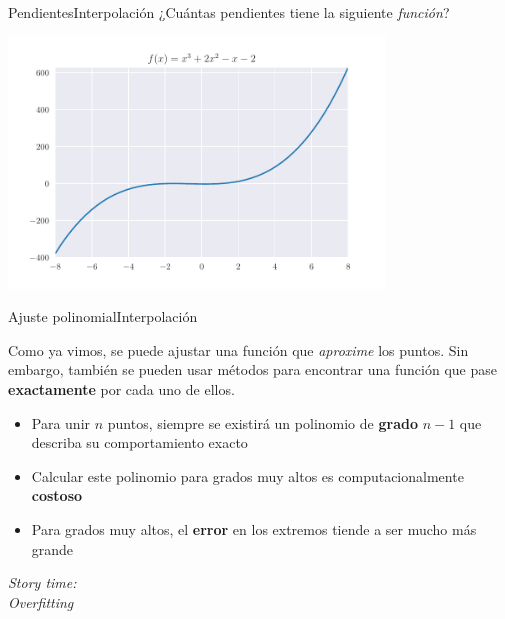 \documentclass[spanish, c, dvipsnames]{beamer}
\begin{document}
\begin{frame}{Pendientes}{Interpolación}
    ¿Cuántas pendientes tiene la siguiente \textsl{función}?

    \bigskip

    \begin{center}
        \includegraphics[width=0.75\textwidth]{cubic.pdf}
    \end{center}

\end{frame}

\begin{frame}{Ajuste polinomial}{Interpolación}
    
    Como ya vimos, se puede ajustar una función que \textsl{aproxime} los puntos.
    Sin embargo, también se pueden usar métodos para encontrar una función que pase \textbf{exactamente} por cada uno de ellos. \pause

    \bigskip

    \begin{itemize}[<+->]
        \item Para unir $n$ puntos, siempre se existirá un \alert{polinomio} de \textbf{grado} $n-1$ que describa su comportamiento exacto
        \item Calcular este polinomio para grados muy altos es computacionalmente \textbf{costoso}
        \item Para grados muy altos, el \textbf{error} en los extremos tiende a ser mucho más grande
    \end{itemize} \pause
    
    \begin{center}
        \itshape
        Story time:\\
        Overfitting
    \end{center}

\end{frame}
\end{document}
